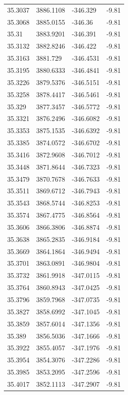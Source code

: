 \begin{table}[H]
\begin{tabular}{llll}
35.3037 & 3886.1108 & -346.329 & -9.81 \\
35.3068 & 3885.0155 & -346.36 & -9.81 \\
35.31 & 3883.9201 & -346.391 & -9.81 \\
35.3132 & 3882.8246 & -346.422 & -9.81 \\
35.3163 & 3881.729 & -346.4531 & -9.81 \\
35.3195 & 3880.6333 & -346.4841 & -9.81 \\
35.3226 & 3879.5376 & -346.5151 & -9.81 \\
35.3258 & 3878.4417 & -346.5461 & -9.81 \\
35.329 & 3877.3457 & -346.5772 & -9.81 \\
35.3321 & 3876.2496 & -346.6082 & -9.81 \\
35.3353 & 3875.1535 & -346.6392 & -9.81 \\
35.3385 & 3874.0572 & -346.6702 & -9.81 \\
35.3416 & 3872.9608 & -346.7012 & -9.81 \\
35.3448 & 3871.8644 & -346.7323 & -9.81 \\
35.3479 & 3870.7678 & -346.7633 & -9.81 \\
35.3511 & 3869.6712 & -346.7943 & -9.81 \\
35.3543 & 3868.5744 & -346.8253 & -9.81 \\
35.3574 & 3867.4775 & -346.8564 & -9.81 \\
35.3606 & 3866.3806 & -346.8874 & -9.81 \\
35.3638 & 3865.2835 & -346.9184 & -9.81 \\
35.3669 & 3864.1864 & -346.9494 & -9.81 \\
35.3701 & 3863.0891 & -346.9804 & -9.81 \\
35.3732 & 3861.9918 & -347.0115 & -9.81 \\
35.3764 & 3860.8943 & -347.0425 & -9.81 \\
35.3796 & 3859.7968 & -347.0735 & -9.81 \\
35.3827 & 3858.6992 & -347.1045 & -9.81 \\
35.3859 & 3857.6014 & -347.1356 & -9.81 \\
35.389 & 3856.5036 & -347.1666 & -9.81 \\
35.3922 & 3855.4057 & -347.1976 & -9.81 \\
35.3954 & 3854.3076 & -347.2286 & -9.81 \\
35.3985 & 3853.2095 & -347.2596 & -9.81 \\
35.4017 & 3852.1113 & -347.2907 & -9.81 \\

\end{tabular}
\end{table}
